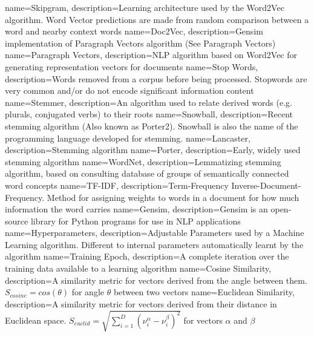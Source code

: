 {
name={Skipgram},
description={Learning architecture used by the Word2Vec algorithm. Word Vector predictions are made from random comparison between a word and nearby context words} 
}
{
name={Doc2Vec},
description={Gensim implementation of Paragraph Vectors algorithm (See Paragraph Vectors)} 
}
{
name={Paragraph Vectors},
description={NLP algorithm based on Word2Vec for generating representation vectors for documents} 
}
{
name={Stop Words},
description={Words removed from a corpus before being processed. Stopwords are very common and/or do not encode significant information content} 
}
{
name={Stemmer},
description={An algorithm used to relate derived words (e.g. plurals, conjugated verbs) to their roots} 
}
{
name={Snowball},
description={Recent stemming algorithm \cite{snowball} (Also known as Porter2). Snowball is also the name of the programming language developed for stemming.} 
}
{
name={Lancaster},
description={Stemming algorithm \cite{lancaster}} 
}
{
name={Porter},
description={Early, widely used stemming algorithm \cite{porter}} 
}
{
name={WordNet},
description={Lemmatizing stemming algorithm, based on consulting database of groups of semantically connected word concepts \cite{wordnet1} \cite{wordnet2} \cite{wordnet3}} 
}
{
name={TF-IDF},
description={Term-Frequency Inverse-Document-Frequency. Method for assigning weights to words in a document for how much information the word carries} 
}
{
name={Gensim},
description={Gensim is an open-source library for Python programs for use in NLP applications} 
}
{
name={Hyperparameters},
description={Adjustable Parameters used by a Machine Learning algorithm. Different to internal parameters automatically learnt by the algorithm} 
}
{
name={Training  Epoch},
description={A complete iteration over the training data available to a learning algorithm} 
}
{
name={Cosine Similarity},
description={A similarity metric for vectors derived from the angle between them. $S_{cosine}=cos\left(\theta\right)$ for angle $\theta$ between two vectors} 
}
{
name={Euclidean Similarity},
description={A similarity metric for vectors derived from their distance in Euclidean space. $S_{euclid} = \sqrt{\sum_{i=1}^{D}(\nu_i^{\alpha}-\nu_i^{\beta})^{2}}$ for vectors $\alpha$ and $\beta$}
}

